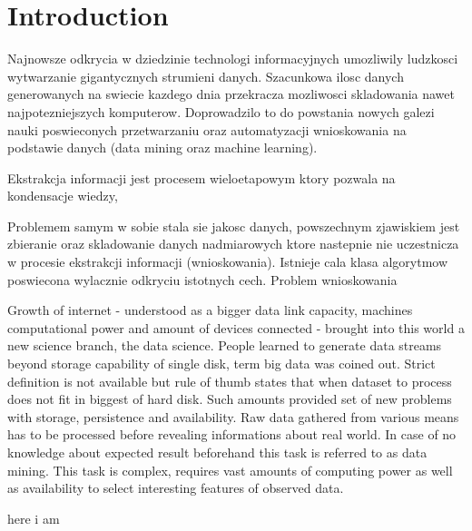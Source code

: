 \chapter{Introduction}
\label{cha:introduction}

Najnowsze odkrycia w dziedzinie technologi informacyjnych umozliwily ludzkosci wytwarzanie gigantycznych strumieni danych. Szacunkowa ilosc danych generowanych na swiecie kazdego dnia przekracza mozliwosci skladowania nawet najpotezniejszych komputerow. Doprowadzilo to do powstania nowych galezi nauki poswieconych przetwarzaniu oraz automatyzacji wnioskowania na podstawie danych (data mining oraz machine learning).

Ekstrakcja informacji jest procesem wieloetapowym ktory pozwala na kondensacje wiedzy, 

Problemem samym w sobie stala sie jakosc danych, powszechnym zjawiskiem jest zbieranie oraz skladowanie danych nadmiarowych ktore nastepnie nie uczestnicza w procesie ekstrakcji informacji (wnioskowania). Istnieje cala klasa algorytmow poswiecona wylacznie odkryciu istotnych cech.
Problem wnioskowania 

Growth of internet - understood as a bigger data link capacity, machines computational power and amount of devices connected - brought into this world a new science branch, the data science. People learned to generate data streams beyond storage capability of single disk, term big data was coined out. Strict definition is not available but rule of thumb states that when dataset to process does not fit in biggest of hard disk. Such amounts provided set of new problems with storage, persistence and availability.
Raw data gathered from various means has to be processed before revealing informations about real world. In case of no knowledge about expected result beforehand this task is referred to as data mining. This task is complex, requires vast amounts of computing power as well as availability to select interesting features of observed data. 


here i am\cite{madeiraoliveira2004}
\textbf{}

